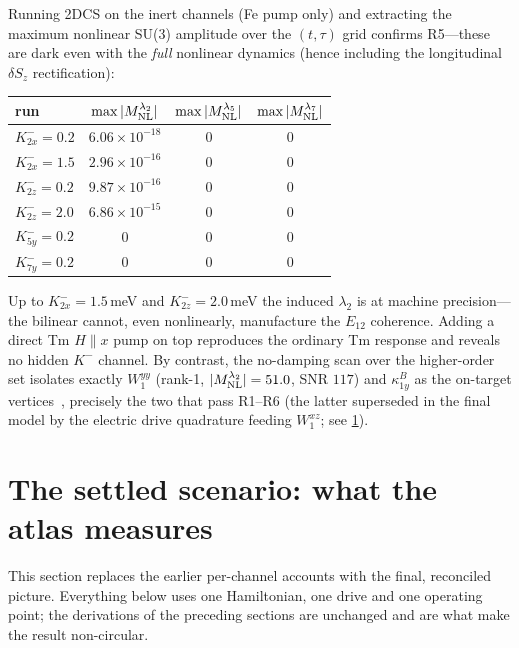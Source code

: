 \documentclass[11pt,a4paper]{article}
\begin{document}
Running 2DCS on the inert channels (Fe pump only) and extracting the maximum
nonlinear SU(3) amplitude over the $(t,\tau)$ grid confirms R5---these are
dark even with the \emph{full} nonlinear dynamics (hence including the
longitudinal $\delta S_z$ rectification):
\begin{center}
\renewcommand{\arraystretch}{1.15}
\begin{tabular}{lccc}
\toprule
run & $\max|M_{\rm NL}^{\lambda_2}|$ & $\max|M_{\rm NL}^{\lambda_5}|$ & $\max|M_{\rm NL}^{\lambda_7}|$ \\
\midrule
$K^-_{2x}=0.2$ & $6.06\times10^{-18}$ & $0$ & $0$ \\
$K^-_{2x}=1.5$ & $2.96\times10^{-16}$ & $0$ & $0$ \\
$K^-_{2z}=0.2$ & $9.87\times10^{-16}$ & $0$ & $0$ \\
$K^-_{2z}=2.0$ & $6.86\times10^{-15}$ & $0$ & $0$ \\
$K^-_{5y}=0.2$ & $0$ & $0$ & $0$ \\
$K^-_{7y}=0.2$ & $0$ & $0$ & $0$ \\
\bottomrule
\end{tabular}
\end{center}
Up to $K^-_{2x}=1.5\,$meV and $K^-_{2z}=2.0\,$meV the induced $\lambda_2$ is at
machine precision---the bilinear cannot, even nonlinearly, manufacture the
$E_{12}$ coherence.  Adding a direct Tm $H\!\parallel x$ pump on top reproduces
the ordinary Tm response and reveals no hidden $K^-$ channel.  By contrast, the
no-damping scan over the higher-order set isolates exactly $W^{yy}_1$ (rank-1,
$|M_{\rm NL}^{\lambda_2}|=51.0$, SNR $117$) and $\kappa^B_{1y}$ as the on-target
vertices~\cite{HOreport}, precisely the two that pass R1--R6 (the latter
superseded in the final model by the electric drive quadrature feeding
$W^{xz}_1$; see \cref{sec:settled}).

\section{The settled scenario: what the atlas measures}
\label{sec:settled}

This section replaces the earlier per-channel accounts with the final,
reconciled picture.  Everything below uses one Hamiltonian, one drive
and one operating point; the derivations of the preceding sections are
unchanged and are what make the result non-circular.
\end{document}
